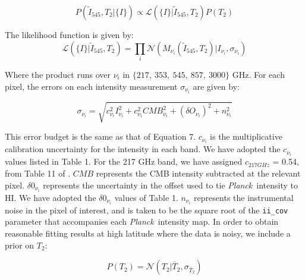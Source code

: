 \documentclass{emulateapj}
\newcommand{\PLANCK}{{\it Planck}}
\begin{document}
\begin{equation}
P(\tilde{I}_{545}, T_2|\{I\}) \propto \mathcal{L}(\{I\}|\tilde{I}_{545}, T_2)P(T_2)
\end{equation}

The likelihood function is given by:
\begin{equation}
\mathcal{L}(\{I\}|\tilde{I}_{545}, T_2) = \displaystyle\prod\limits_{i}\mathcal{N}(M_{\nu_{i}}(\tilde{I}_{545}, T_2)|I_{\nu_{i}}, \sigma_{\nu_i})
\end{equation}


Where the product runs over $\nu_i$ in $\{217,\ 353,\ 545,\ 857,\ 3000\}$ GHz. 
For each pixel, the errors on each intensity measurement $\sigma_{\nu_i}$ are 
given by:

\begin{equation}
\sigma_{\nu_i} = \sqrt{c^2_{\nu_i}I^2_{\nu_i} + c^2_{\nu_i}CMB^2_{\nu_i} + (\delta O_{\nu_i})^2 + n^2_{\nu_i}}
\end{equation}


This error budget is the same as that of \cite{planckdust} Equation 7. 
$c_{\nu_i}$ is the multiplicative calibration uncertainty for the intensity in 
each band. We have adopted the $c_{\nu_i}$ values listed in \cite{planckdust} 
Table 1. For the 217 GHz band, we have assigned $c_{217 GHz}$ = 0.54, from 
Table 11 of \cite{planckcalib}. $CMB$ represents the CMB intensity 
subtracted at the relevant pixel. $\delta0_{\nu_i}$ represents the uncertainty
in the offset used to tie \PLANCK~intensity to HI. We have adopted the 
 $\delta0_{\nu_i}$ values of \cite{planckdust} Table 1. $n_{\nu_i}$ represents 
the instrumental noise in the pixel of interest, and is taken to be the square 
root of the \verb|ii_cov| parameter that accompanies each \PLANCK~intensity 
map. In order to obtain reasonable fitting results at high latitude where the 
data is noisy, we include a prior on $T_2$:


\begin{equation}
P(T_2) = \mathcal{N}(T_2|\bar{T}_2, \sigma_{\bar{T}_2})
\end{equation}

\end{document}

